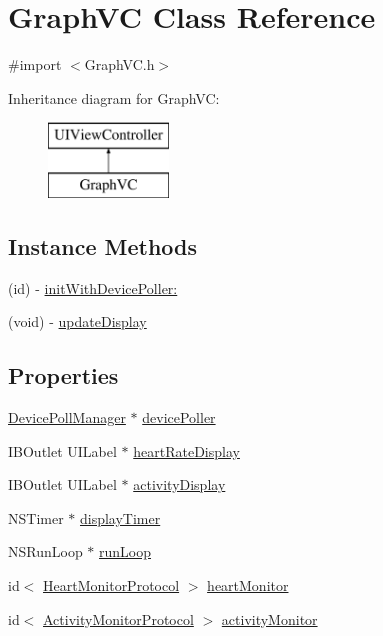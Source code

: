 \hypertarget{interface_graph_v_c}{\section{Graph\-V\-C Class Reference}
\label{interface_graph_v_c}
}


{\ttfamily \#import $<$Graph\-V\-C.\-h$>$}

Inheritance diagram for Graph\-V\-C\-:\begin{figure}[H]
\begin{center}
\leavevmode
\includegraphics[height=2.000000cm]{interface_graph_v_c}
\end{center}
\end{figure}
\subsection*{Instance Methods}
\begin{DoxyCompactItemize}
\item 
(id) -\/ \hyperlink{interface_graph_v_c_ad0a240dde98905eca43bb92db53e9478}{init\-With\-Device\-Poller\-:}
\item 
(void) -\/ \hyperlink{interface_graph_v_c_a7521f143474f68142628970e9f1d7706}{update\-Display}
\end{DoxyCompactItemize}
\subsection*{Properties}
\begin{DoxyCompactItemize}
\item 
\hyperlink{interface_device_poll_manager}{Device\-Poll\-Manager} $\ast$ \hyperlink{interface_graph_v_c_a8a00c63cc6cab8b3c1cddaaacc9d12fc}{device\-Poller}
\item 
I\-B\-Outlet U\-I\-Label $\ast$ \hyperlink{interface_graph_v_c_ad434b1d838f58441c9d6499936ccd620}{heart\-Rate\-Display}
\item 
I\-B\-Outlet U\-I\-Label $\ast$ \hyperlink{interface_graph_v_c_a75fd5eb6ebad27cbce29475d94459329}{activity\-Display}
\item 
N\-S\-Timer $\ast$ \hyperlink{interface_graph_v_c_a5ef6730daa124f69087996078418db0d}{display\-Timer}
\item 
N\-S\-Run\-Loop $\ast$ \hyperlink{interface_graph_v_c_aaeee6afe374009cd16e4a6a1d2270efa}{run\-Loop}
\item 
id$<$ \hyperlink{protocol_heart_monitor_protocol-p}{Heart\-Monitor\-Protocol} $>$ \hyperlink{interface_graph_v_c_ab4c3c7d6990f1e3be550b443e2c7a532}{heart\-Monitor}
\item 
id$<$ \hyperlink{protocol_activity_monitor_protocol-p}{Activity\-Monitor\-Protocol} $>$ \hyperlink{interface_graph_v_c_a0216f83efd648d18c90793fd67206ad8}{activity\-Monitor}
\end{DoxyCompactItemize}


